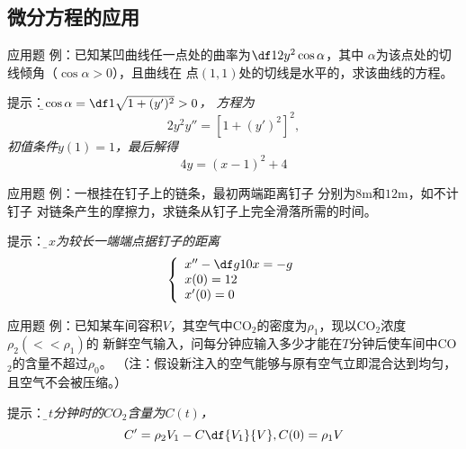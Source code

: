 \subsection{微分方程的应用}

\begin{frame}{应用题}
	\linespread{1.4}
	\alert{例：}已知某凹曲线任一点处的曲率为$\df1{2y^2\cos\alpha}$，其中
	$\alpha$为该点处的切线倾角（$\cos\alpha>0$），且曲线在
	点$(1,1)$处的切线是水平的，求该曲线的方程。
	
	\pause\alert{提示：}\it\b $\cos\alpha=\df1{\sqrt{1+(y')^2}}>0$，
	方程为
	$$2y^2y''=[1+(y')^2]^2,$$
	初值条件$y(1)=1$，最后解得
	$$4y=(x-1)^2+4$$
\end{frame}

\begin{frame}{应用题}
	\linespread{1.2}
	\alert{例：}一根挂在钉子上的链条，最初两端距离钉子
	分别为$8$m和$12$m，如不计钉子
	对链条产生的摩擦力，求链条从钉子上完全滑落所需的时间。
	
	\pause\alert{提示：}\it\b 设$x$为较长一端端点据钉子的距离
	$$\left\{\begin{array}{l}
		x''-\df g{10}x=-g\\
		x(0)=12\\
		x'(0)=0
	\end{array}\right.$$
\end{frame}

\begin{frame}{应用题}
	\linespread{1.2}
	\alert{例：}已知某车间容积$V$，其空气中CO$_2$的密度为$\rho_1$，现以CO$_2$浓度$\rho_2(<<\rho_1)$的
	新鲜空气输入，问每分钟应输入多少才能在$T$分钟后使车间中CO$_2$的含量不超过$\rho_0$。
	（注：假设新注入的空气能够与原有空气立即混合达到均匀，且空气不会被压缩。）

	\pause\alert{提示：}\it\b 设$t$分钟时的$CO_2$含量为$C(t)$，
	$$C'=\rho_2V_1-C\df{V_1}{V},C(0)=\rho_1V$$
\end{frame}